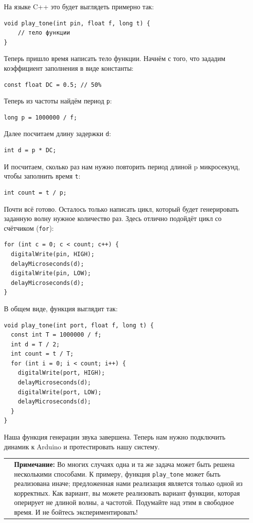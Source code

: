 \documentclass[a4paper,twoside]{book}
\newcommand{\note}[1]{
  \vspace{8pt}
  \begin{tabularx}{\textwidth}{m{1cm} m{9cm}}
    
    & \textbf{Примечание:} #1 \\
  \end{tabularx}
}
\begin{document}
На языке C++ это будет выглядеть примерно так:
\begin{verbatim}
void play_tone(int pin, float f, long t) {
    // тело функции
}
\end{verbatim}

Теперь пришло время написать тело функции. Начнём с того, что зададим
коэффициент заполнения в виде константы:
\begin{verbatim}
const float DC = 0.5; // 50%
\end{verbatim}

Теперь из частоты найдём период \texttt{p}:
\begin{verbatim}
long p = 1000000 / f;
\end{verbatim}

Далее посчитаем длину задержки \texttt{d}:
\begin{verbatim}
int d = p * DC;
\end{verbatim}

И посчитаем, сколько раз нам нужно повторить период длиной p микросекунд, чтобы
заполнить время \texttt{t}:
\begin{verbatim}
int count = t / p;
\end{verbatim}

Почти всё готово. Осталось только написать цикл, который будет генерировать
заданную волну нужное количество раз. Здесь отлично подойдёт цикл со счётчиком
(\texttt{for}):

\begin{verbatim}
for (int c = 0; c < count; c++) {
  digitalWrite(pin, HIGH);
  delayMicroseconds(d);
  digitalWrite(pin, LOW);
  delayMicroseconds(d);
}
\end{verbatim}

В общем виде, функция выглядит так:

\begin{verbatim}
void play_tone(int port, float f, long t) {
  const int T = 1000000 / f;
  int d = T / 2;
  int count = t / T;
  for (int i = 0; i < count; i++) {
    digitalWrite(port, HIGH);
    delayMicroseconds(d);
    digitalWrite(port, LOW);
    delayMicroseconds(d);
  }
}
\end{verbatim}

Наша функция генерации звука завершена. Теперь нам нужно подключить динамик к
Arduino и протестировать нашу систему.

\note{Во многих случаях одна и та же задача может быть решена несколькими
  способами. К примеру, функция \texttt{play\_tone} может быть реализована
  иначе; предложенная нами реализация является только одной из корректных. Как
  вариант, вы можете реализовать вариант функции, которая оперирует не длиной
  волны, а частотой. Подумайте над этим в свободное время. И не бойтесь
  экспериментировать! }
\end{document}
